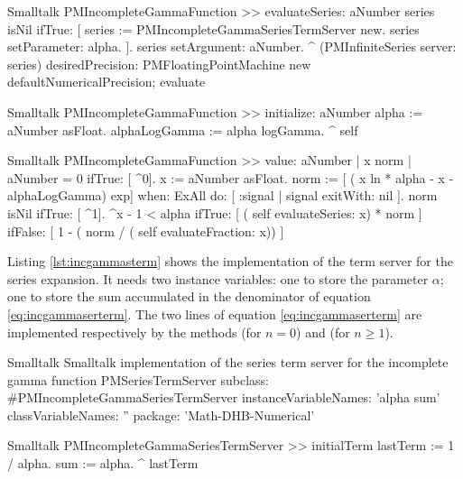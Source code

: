 \begin{displaycode}{Smalltalk}
PMIncompleteGammaFunction >> evaluateSeries: aNumber
    series isNil
        ifTrue: [ series := PMIncompleteGammaSeriesTermServer new.
                  series setParameter: alpha.
                ].
    series setArgument: aNumber.
    ^ (PMInfiniteSeries server: series)
        desiredPrecision: PMFloatingPointMachine new defaultNumericalPrecision;
        evaluate
\end{displaycode}

\begin{displaycode}{Smalltalk}
PMIncompleteGammaFunction >> initialize: aNumber
    alpha := aNumber asFloat.
    alphaLogGamma := alpha logGamma.
    ^ self
\end{displaycode}

\begin{displaycode}{Smalltalk}
PMIncompleteGammaFunction >> value: aNumber
    | x norm |
    aNumber = 0
        ifTrue: [ ^0].
    x := aNumber asFloat.
    norm := [ ( x ln * alpha - x - alphaLogGamma) exp] when: ExAll 
                                do: [ :signal | signal exitWith: nil ].
    norm isNil
        ifTrue: [ ^1].
    ^x - 1 < alpha
        ifTrue: [ ( self evaluateSeries: x) * norm ]
        ifFalse: [ 1 - ( norm / ( self evaluateFraction: x)) ]
\end{displaycode}

Listing \ref{lst:incgammasterm} shows the implementation of the
term server for the series expansion. It needs two instance
variables: one to store the parameter $\alpha$; one to store the
sum accumulated in the denominator of equation
\ref{eq:incgammaserterm}. The two lines of equation
\ref{eq:incgammaserterm} are implemented respectively by the
methods   (for $n=0$) and  (for
$n\ge 1$).

\begin{listing}[label=lst:incgammasterm]{Smalltalk}
{Smalltalk implementation of the series term server for the incomplete gamma function}
PMSeriesTermServer subclass: #PMIncompleteGammaSeriesTermServer
   instanceVariableNames: 'alpha sum'
   classVariableNames: ''
   package: 'Math-DHB-Numerical'
\end{listing}

\begin{displaycode}{Smalltalk}
PMIncompleteGammaSeriesTermServer >> initialTerm
  lastTerm := 1 / alpha.
    sum := alpha.
    ^ lastTerm
\end{displaycode}

